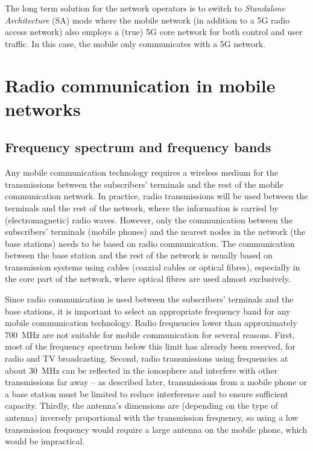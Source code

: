 The long term solution for the network operators is to switch to \emph{Standalone Architecture} (SA) mode where the mobile network (in addition to a 5G radio access network) also employs a (true) 5G core network for both control and user traffic. In this case, the mobile only communicates with a 5G network.

\chapter{Radio communication in mobile networks}

\section{Frequency spectrum and frequency bands}
Any mobile communication technology requires a wireless medium for the transmissions between the subscribers' terminals and the rest of the mobile communication network. In practice, radio transmissions will be used between the terminals and the rest of the network, \ie where the information is carried by (electromagnetic) radio waves. However, only the communication between the subscribers' terminals (\ie mobile phones) and the nearest nodes in the network (\ie the base stations) needs to be based on radio communication. The communication between the base station and the rest of the network is usually based on transmission systems using cables (coaxial cables or optical fibres), especially in the core part of the network, where optical fibres are used almost exclusively.

Since radio communication is used between the subscribers' terminals and the base stations, it is important to select an appropriate frequency band for any mobile communication technology. Radio frequencies lower than approximately 700~MHz are not suitable for mobile communication for several reasons. First, most of the frequency spectrum below this limit has already been reserved, \eg for radio and TV broadcasting. Second, radio transmissions using frequencies at about 30~MHz can be reflected in the ionosphere and interfere with other transmissions far away -- as described later, transmissions from a mobile phone or a base station must be limited to reduce interference and to ensure sufficient capacity. Thirdly, the antenna's dimensions are (depending on the type of antenna) inversely proportional with the transmission frequency, so using a low transmission frequency would require a large antenna on the mobile phone, which would be impractical. 

